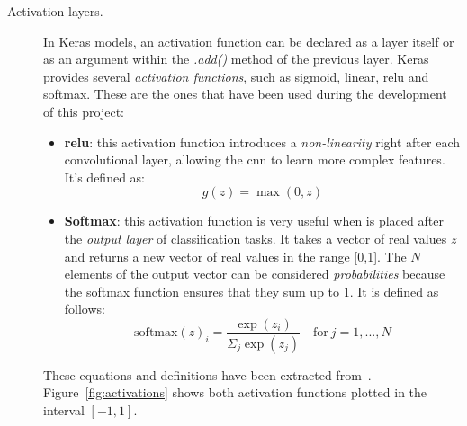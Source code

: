 \begin{description}
	\item[Activation layers.] In Keras models, an activation function can be declared as a layer itself or as an argument within the \textit{.add()} method of the previous layer. Keras provides several \emph{activation functions}, such as sigmoid, linear, \gls{relu} and softmax. These are the ones that have been used during the development of this project:
	\begin{itemize}
		\item \textbf{\gls{relu}}: this activation function introduces a \emph{non-linearity} right after each convolutional layer, allowing the \gls{cnn} to learn more complex features. It's defined as:
		\begin{equation}\label{eq:relu}
		g(z)=\max(0,z)
		\end{equation}
		
		\item \textbf{Softmax}: this activation function is very useful when is placed after the \emph{output layer} of classification tasks. It takes a vector of real values $z$ and returns a new vector of real values in the range [0,1]. The $N$ elements of the output vector can be considered \emph{probabilities} because the softmax function ensures that they sum up to 1. It is defined as follows:
		\begin{equation}\label{eq:SoftMax}
		\mathrm{softmax}(z)_i=\frac{\exp(z_i)}{\Sigma_{j}{\exp(z_j)}} \quad \mathrm{for} \ j=1, ...,N
		\end{equation}
	\end{itemize}
	These equations and definitions have been extracted from~\cite{Goodfellow-et-al-2016}. Figure~\ref{fig:activations} shows both activation functions plotted in the interval $[-1,1]$.


\end{description}
